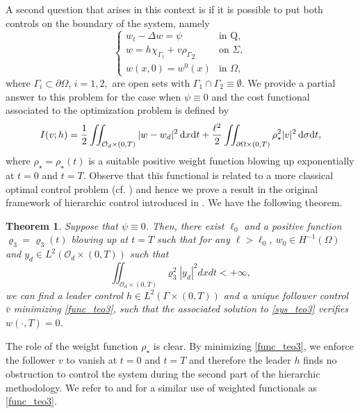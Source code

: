 \documentclass{aims}
\newtheorem{theorem}{Theorem}[section]
\theoremstyle{definition}
\def\cbd{\Gamma}
\newcommand\csin[1]{\chi_{#1}}
\def\csbd{\rho_{\Gamma}}
\def\dx{\,\textnormal{d}x}
\def\dt{\textnormal{d}t}
\def\d{\,\textnormal{d}}
\begin{document}
A second question that arises in this context is if it is possible to put both controls on the boundary of the system, namely
%
\begin{equation}\label{sys_teo3}
\begin{cases}
w_t-\Delta w=\psi & \text{in Q}, \\
w= h\csin{\Gamma_1}+ v{\csbd}_{2} &\text{on } \Sigma, \\
w(x,0)=w^0(x) & \text{in } \Omega,
\end{cases}
\end{equation}
%
where $\Gamma_{i}\subset\partial \Omega$, $i=1,2,$ are open sets with $\cbd_1\cap\cbd_2\equiv \emptyset$. We provide a partial answer to this problem for the case when $\psi\equiv 0$ and the cost functional associated to the optimization problem is defined by
%
\begin{equation}\label{func_teo3}
I(v;h)=\frac{1}{2}\iint_{\mathcal O_d\times(0,T)}|w-w_d|^2\dx\dt+\frac{\ell^2}{2}\iint_{\partial\Omega\times(0,T)}\rho_\star^2|v|^2\d\sigma\dt,
\end{equation}
%
where $\rho_\star=\rho_\star(t)$ is a suitable positive weight function blowing up exponentially at $t=0$ and $t=T$. Observe that this functional is related to a more classical optimal control problem (cf. \cite{Lions_optim,trol}) and hence we prove a result in the original framework of hierarchic control introduced in \cite{LionsSta}. We have the following theorem.
%
\begin{theorem}\label{teo3}
Suppose that $\psi\equiv 0$. Then, there exist $\ell_0$ and a positive function $\varrho_3=\varrho_3(t)$ blowing up at $t=T$ such that for any $\ell>\ell_0$, $w_0\in H^{-1}(\Omega)$ and $y_d\in L^2(\mathcal O_d\times(0,T))$ such that
\begin{equation*}%
\iint_{\mathcal O_d\times(0,T)}\varrho_3^2|y_d|^2dxdt<+\infty,
\end{equation*}
we can find a leader control $h\in L^2(\cbd\times(0,T))$ and a unique follower control $\bar v$ minimizing \eqref{func_teo3}, such that the associated solution to \eqref{sys_teo3} verifies $w(\cdot,T)=0$.
\end{theorem}

The role of the weight function  $\rho_\star$ is clear. By minimizing \eqref{func_teo3}, we enforce the follower $v$ to vanish at $t=0$ and $t=T$ and therefore the leader $h$ finds no obstruction to control the system during the second part of the hierarchic methodology. We refer to \cite{araruna} and \cite{vhs_corri} for a similar use of weighted functionals as \eqref{func_teo3}. 
\end{document}
